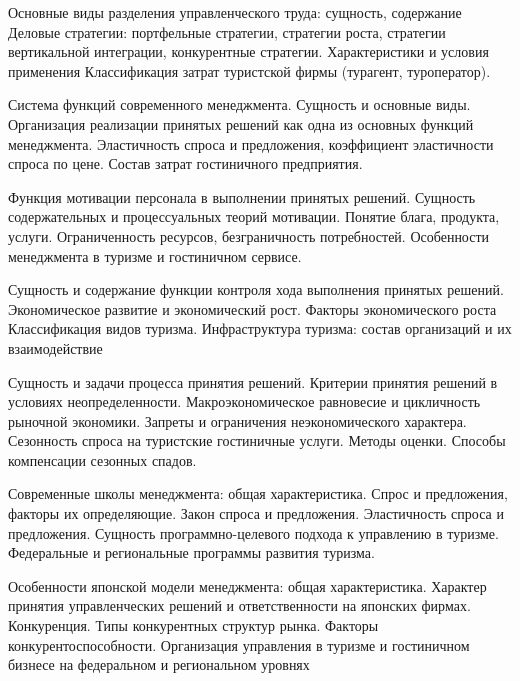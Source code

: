 \documentclass[
	11pt,
	a4paper,
	]
	{article}
\begin{document}
\bigskip

\noindent{} 
	{
		Основные виды разделения управленческого труда: сущность, содержание
	}{
		Деловые стратегии: портфельные стратегии, стратегии роста, стратегии вертикальной интеграции, конкурентные стратегии. Характеристики и условия применения
	}{
		Классификация затрат туристской фирмы (турагент, туроператор).
	}

\bigskip

\noindent{} 
	{
		Система функций современного менеджмента. Сущность и основные виды. Организация реализации принятых решений как одна из основных функций менеджмента.
	}{
		Эластичность спроса и предложения, коэффициент эластичности спроса по цене.
	}{
		Состав затрат гостиничного предприятия.
	}

\bigskip

\noindent{} 
	{
		Функция мотивации персонала в выполнении принятых решений. Сущность содержательных и процессуальных теорий мотивации.
	}{
		Понятие блага, продукта, услуги. Ограниченность ресурсов, безграничность потребностей.
	}{
		Особенности менеджмента в туризме и гостиничном сервисе.
	}

\bigskip

\noindent{} 
	{
		Сущность и содержание функции контроля хода выполнения принятых решений.
	}{
		Экономическое развитие и экономический рост. Факторы экономического роста
	}{
		Классификация видов туризма. Инфраструктура туризма: состав организаций и их взаимодействие
	}

\bigskip

\noindent{} 
	{
		Сущность и задачи процесса принятия решений. Критерии принятия решений в условиях неопределенности.
	}{
		Макроэкономическое равновесие и цикличность рыночной экономики. Запреты и ограничения неэкономического характера.
	}{
		Сезонность спроса на туристские гостиничные услуги. Методы оценки. Способы компенсации сезонных спадов.
	}

\bigskip

\noindent{} 
	{
		Современные школы менеджмента: общая характеристика.
	}{
		Спрос и предложения, факторы их определяющие. Закон спроса и предложения. Эластичность спроса и предложения.
	}{
		Сущность программно-целевого подхода к управлению в туризме. Федеральные и региональные программы развития туризма.
	}

\bigskip

\noindent{} 
	{
		Особенности японской модели менеджмента: общая характеристика. Характер принятия управленческих решений и ответственности на японских фирмах.
	}{
		Конкуренция. Типы конкурентных структур рынка. Факторы конкурентоспособности.
	}{
		Организация управления в туризме и гостиничном бизнесе на федеральном и региональном уровнях
	}
\end{document}
